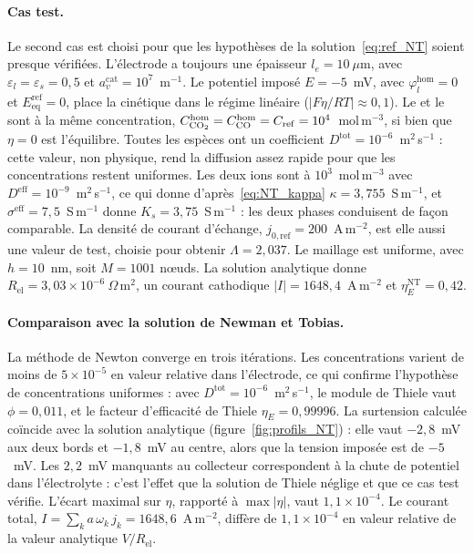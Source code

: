 \paragraph{Cas test.} Le second cas est choisi pour que les hypothèses de la
solution~\eqref{eq:ref_NT} soient presque vérifiées. L'électrode a toujours
une épaisseur $l_e = 10~\mu$m, avec
$\varepsilon_l = \varepsilon_s = 0{,}5$ et
$a_v^{\mathrm{cat}} = 10^7$~m$^{-1}$. Le potentiel imposé
$E = -5$~mV, avec $\varphi_l^{\mathrm{hom}} = 0$ et
$E_{\mathrm{eq}}^{\mathrm{ref}} = 0$, place la cinétique dans le régime
linéaire ($|F\eta/RT| \approx 0{,}1$). Le  et le  sont à la
même concentration, $C_{\ce{CO2}}^{\mathrm{hom}} = C_{\ce{CO}}^{\mathrm{hom}}
= C_{\mathrm{ref}} = 10^4$~mol\,m$^{-3}$, si bien que $\eta = 0$ est
l'équilibre. Toutes les espèces ont un coefficient
$D^{\mathrm{tot}} = 10^{-6}$~m$^2$\,s$^{-1}$ : cette valeur, non physique,
rend la diffusion assez rapide pour que les concentrations restent
uniformes. Les deux ions sont à $10^3$~mol\,m$^{-3}$ avec
$D^{\mathrm{eff}} = 10^{-9}$~m$^2$\,s$^{-1}$, ce qui donne d'après~\eqref{eq:NT_kappa}
$\kappa = 3{,}755$~S\,m$^{-1}$, et
$\sigma^{\mathrm{eff}} = 7{,}5$~S\,m$^{-1}$ donne $K_s = 3{,}75$~S\,m$^{-1}$ :
les deux phases conduisent de façon comparable. La densité de courant
d'échange, $j_{0,\mathrm{ref}} = 200$~A\,m$^{-2}$, est elle aussi une valeur
de test, choisie pour obtenir $\Lambda = 2{,}037$. Le maillage est uniforme,
avec $h = 10$~nm, soit $M = 1001$ nœuds. La solution analytique donne
$R_{\mathrm{el}} = 3{,}03\times10^{-6}~\Omega$\,m$^2$, un courant cathodique
$|I| = 1648{,}4$~A\,m$^{-2}$ et $\eta_E^{\mathrm{NT}} = 0{,}42$.

\paragraph{Comparaison avec la solution de Newman et Tobias.} La méthode de
Newton converge en trois itérations. Les concentrations varient de moins de
$5\times10^{-5}$ en valeur relative dans l'électrode, ce qui confirme
l'hypothèse de concentrations uniformes : avec
$D^{\mathrm{tot}} = 10^{-6}$~m$^2$\,s$^{-1}$, le module de Thiele vaut
$\phi = 0{,}011$, et le facteur d'efficacité de Thiele
$\eta_E = 0{,}99996$. La surtension calculée coïncide avec
la solution analytique (figure~\ref{fig:profils_NT}) : elle vaut
$-2{,}8$~mV aux deux bords et $-1{,}8$~mV au centre, alors que la tension
imposée est de $-5$~mV. Les $2{,}2$~mV manquants au collecteur correspondent à
la chute de potentiel dans l'électrolyte : c'est l'effet que la solution de
Thiele néglige et que ce cas test vérifie. L'écart maximal sur $\eta$,
rapporté à $\max|\eta|$, vaut $1{,}1\times10^{-4}$. Le courant total,
$I = \sum_k a\,\omega_k\,j_k = 1648{,}6$~A\,m$^{-2}$, diffère de
$1{,}1\times10^{-4}$ en valeur relative de la valeur analytique
$V/R_{\mathrm{el}}$.

